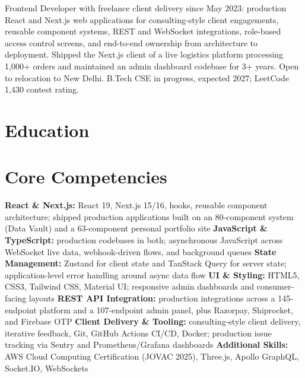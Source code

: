 \documentclass[11pt,a4paper,sans]{moderncv}
\begin{document}
\makecvtitle


\vspace{4pt}
\small{Frontend Developer with freelance client delivery since May 2023: production React and Next.js web applications for consulting-style client engagements, reusable component systems, REST and WebSocket integrations, role-based access control screens, and end-to-end ownership from architecture to deployment. Shipped the Next.js client of a live logistics platform processing 1,000+ orders and maintained an admin dashboard codebase for 3+ years. Open to relocation to New Delhi. B.Tech CSE in progress, expected 2027; LeetCode 1,430 contest rating.}


\section{Education}
\vspace{1pt}


\section{Core Competencies}
\vspace{1pt}
\raggedright
\textbf{React \& Next.js:} React 19, Next.js 15/16, hooks, reusable component architecture; shipped production applications built on an 80-component system (Data Vault) and a 63-component personal portfolio site \textbar{}
\textbf{JavaScript \& TypeScript:} production codebases in both; asynchronous JavaScript across WebSocket live data, webhook-driven flows, and background queues \textbar{}
\textbf{State Management:} Zustand for client state and TanStack Query for server state; application-level error handling around async data flow \textbar{}
\textbf{UI \& Styling:} HTML5, CSS3, Tailwind CSS, Material UI; responsive admin dashboards and consumer-facing layouts \textbar{}
\textbf{REST API Integration:} production integrations across a 145-endpoint platform and a 107-endpoint admin panel, plus Razorpay, Shiprocket, and Firebase OTP \textbar{}
\textbf{Client Delivery \& Tooling:} consulting-style client delivery, iterative feedback, Git, GitHub Actions CI/CD, Docker; production issue tracking via Sentry and Prometheus/Grafana dashboards \textbar{}
\textbf{Additional Skills:} AWS Cloud Computing Certification (JOVAC 2025), Three.js, Apollo GraphQL, Socket.IO, WebSockets
\par\normalfont
\end{document}
